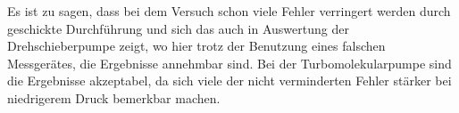 \noindent Es ist zu sagen, dass bei dem Versuch schon viele Fehler verringert werden durch geschickte Durchführung und sich das auch in Auswertung der Drehschieberpumpe zeigt, wo hier 
trotz der Benutzung eines falschen Messgerätes, die Ergebnisse annehmbar sind. Bei der 
Turbomolekularpumpe sind die Ergebnisse akzeptabel, da sich viele der nicht verminderten Fehler stärker bei niedrigerem Druck bemerkbar machen. 